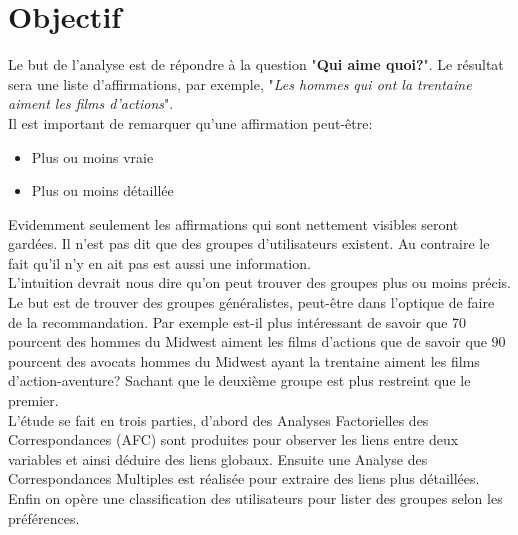 \chapter{Objectif}

Le but de l'analyse est de répondre à la question "\textbf{Qui aime quoi?}". Le résultat sera une liste d'affirmations, par exemple, "\emph{Les hommes qui ont la trentaine aiment les films d'actions}".
\bigskip
\\Il est important de remarquer qu'une affirmation peut-être:
\begin{itemize}
  \item Plus ou moins vraie
  \item Plus ou moins détaillée
\end{itemize}
Evidemment seulement les affirmations qui sont nettement visibles seront gardées. Il n'est pas dit que des groupes d'utilisateurs existent. Au contraire le fait qu'il n'y en ait pas est aussi une information.
\bigskip
\\L'intuition devrait nous dire qu'on peut trouver des groupes plus ou moins précis. Le but est de trouver des groupes généralistes, peut-être dans l'optique de faire de la recommandation. Par exemple est-il plus intéressant de savoir que 70 pourcent des hommes du Midwest aiment les films d'actions que de savoir que 90 pourcent des avocats hommes du Midwest ayant la trentaine aiment les films d'action-aventure? Sachant que le deuxième groupe est plus restreint que le premier.
\bigskip
\\L'étude se fait en trois parties, d'abord des Analyses Factorielles des Correspondances (AFC) sont produites pour observer les liens entre deux variables et ainsi déduire des liens globaux. Ensuite une Analyse des Correspondances Multiples est réalisée pour extraire des liens plus détaillées. Enfin on opère une classification des utilisateurs pour lister des groupes selon les préférences.